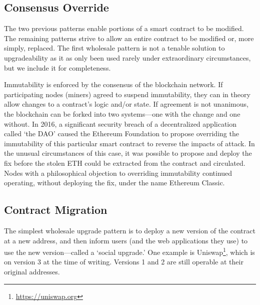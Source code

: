 
\subsection{Consensus Override}
\label{sec:hardfork}

The two previous patterns enable portions of a smart contract to be modified. The remaining patterns strive to allow an entire contract to be modified or, more simply, replaced. The first wholesale pattern is not a tenable solution to upgradeability as it as only been used rarely under extraordinary circumstances, but we include it for completeness. 

Immutability is enforced by the consensus of the blockchain network. If participating nodes (\eg miners) agreed to suspend immutability, they can in theory allow changes to a contract's logic and/or state. If agreement is not unanimous, the blockchain can be forked into two systems---one with the change and one without. In 2016, a significant security breach of a decentralized application called `the DAO' caused the Ethereum Foundation to propose overriding the immutability of this particular smart contract to reverse the impacts of attack. In the unusual circumstances of this case, it was possible to propose and deploy the fix before the stolen ETH could be extracted from the contract and circulated. Nodes with a philosophical objection to overriding immutability continued operating, without deploying the fix, under the name Ethereum Classic.



\subsection{Contract Migration}
\label{sec:migration}

The simplest wholesale upgrade pattern is to deploy a new version of the contract at a new address, and then inform users (and the web applications they use) to use the new version---called a `social upgrade.' One example is Uniswap\footnote{\url{https://uniswap.org}}, which is on version 3 at the time of writing. Versions 1 and 2 are still operable at their original addresses. 

